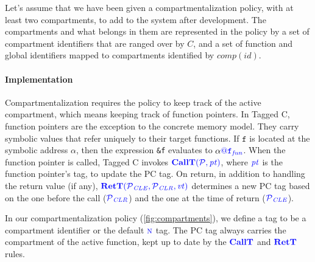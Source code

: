 \documentclass{llncs}
\begin{document}
Let's assume that we have been given a compartmentalization policy, with at least two compartments, to add to the system
after development. The compartments and what belongs in them are represented in the policy by a set of compartment identifiers that 
are ranged over by \(C\), and a set of function and global identifiers mapped to compartments identified by \(\mathit{comp}(id)\).

\paragraph*{Implementation}

Compartmentalization requires the policy to keep track of the active compartment, which means
keeping track of function pointers. In Tagged C, function pointers are the exception to the
concrete memory model. They carry symbolic values that refer uniquely to their target functions.
If \(\mathtt{f}\) is located at the symbolic address \(\alpha\), then
the expression {\tt \&f} evaluates to \(\alpha\tagat\FN[f]\).
When the function pointer is called, Tagged C invokes \(\callt\), where \(\pt\) is the
function pointer's tag, to update the PC tag.
On return, in addition to handling the return value (if any), \(\rett\) determines a new PC tag
based on the one before the call (\(\PCT[_{CLR}]\)) and the one at the time of return (\(\PCT[_{CLE}]\)).

In our compartmentalization policy (\cref{fig:compartments}), we define a tag to be a compartment
identifier or the default \(\N\) tag. The PC tag always carries the compartment of the
active function, kept up to date by the \(\calltname\) and \(\rettname\) rules.
\end{document}
